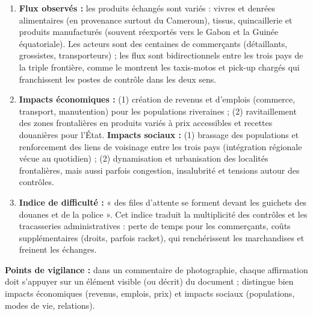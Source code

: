 \documentclass[11pt]{article}
\begin{document}
\begin{corrige}
\begin{enumerate}
\item \textbf{Flux observés :} les produits échangés sont variés : vivres et denrées alimentaires (en provenance surtout du Cameroun), tissus, quincaillerie et produits manufacturés (souvent réexportés vers le Gabon et la Guinée équatoriale). Les acteurs sont des centaines de commerçants (détaillants, grossistes, transporteurs) ; les flux sont bidirectionnels entre les trois pays de la triple frontière, comme le montrent les taxis-motos et pick-up chargés qui franchissent les postes de contrôle dans les deux sens.
\item \textbf{Impacts économiques :} (1) création de revenus et d'emplois (commerce, transport, manutention) pour les populations riveraines ; (2) ravitaillement des zones frontalières en produits variés à prix accessibles et recettes douanières pour l'État. \textbf{Impacts sociaux :} (1) brassage des populations et renforcement des liens de voisinage entre les trois pays (intégration régionale vécue au quotidien) ; (2) dynamisation et urbanisation des localités frontalières, mais aussi parfois congestion, insalubrité et tensions autour des contrôles.
\item \textbf{Indice de difficulté :} « des files d'attente se forment devant les guichets des douanes et de la police ». Cet indice traduit la multiplicité des contrôles et les tracasseries administratives : perte de temps pour les commerçants, coûts supplémentaires (droits, parfois racket), qui renchérissent les marchandises et freinent les échanges.
\end{enumerate}
\textbf{Points de vigilance :} dans un commentaire de photographie, chaque affirmation doit s'appuyer sur un élément visible (ou décrit) du document ; distingue bien impacts économiques (revenus, emplois, prix) et impacts sociaux (populations, modes de vie, relations).
\end{corrige}
\end{document}
